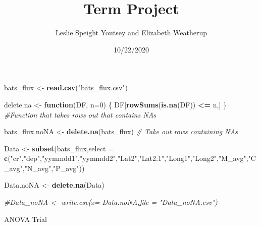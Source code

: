 \documentclass[]{article}
\title{Term Project}
\author{Leslie Speight Youtsey and Elizabeth Weatherup}
\date{10/22/2020}
\newenvironment{Shaded}{\begin{snugshade}}{\end{snugshade}}
\newcommand{\CommentTok}[1]{\textcolor[rgb]{0.56,0.35,0.01}{\textit{#1}}}
\newcommand{\ControlFlowTok}[1]{\textcolor[rgb]{0.13,0.29,0.53}{\textbf{#1}}}
\newcommand{\DataTypeTok}[1]{\textcolor[rgb]{0.13,0.29,0.53}{#1}}
\newcommand{\DecValTok}[1]{\textcolor[rgb]{0.00,0.00,0.81}{#1}}
\newcommand{\KeywordTok}[1]{\textcolor[rgb]{0.13,0.29,0.53}{\textbf{#1}}}
\newcommand{\NormalTok}[1]{#1}
\newcommand{\OperatorTok}[1]{\textcolor[rgb]{0.81,0.36,0.00}{\textbf{#1}}}
\newcommand{\StringTok}[1]{\textcolor[rgb]{0.31,0.60,0.02}{#1}}
\begin{document}
\maketitle

\begin{Shaded}
\begin{Highlighting}[]
\NormalTok{bats_flux <-}\StringTok{ }\KeywordTok{read.csv}\NormalTok{(}\StringTok{"bats_flux.csv"}\NormalTok{)}

\NormalTok{delete.na <-}\StringTok{ }\ControlFlowTok{function}\NormalTok{(DF, }\DataTypeTok{n=}\DecValTok{0}\NormalTok{) \{}
\NormalTok{  DF[}\KeywordTok{rowSums}\NormalTok{(}\KeywordTok{is.na}\NormalTok{(DF)) }\OperatorTok{<=}\StringTok{ }\NormalTok{n,]}
\NormalTok{\} }\CommentTok{#Function that takes rows out that contains NAs }

\NormalTok{bats_flux.noNA <-}\StringTok{ }\KeywordTok{delete.na}\NormalTok{(bats_flux) }\CommentTok{# Take out rows containing NAs }


\NormalTok{Data <-}\StringTok{ }\KeywordTok{subset}\NormalTok{(bats_flux,}\DataTypeTok{select =} \KeywordTok{c}\NormalTok{(}\StringTok{"cr"}\NormalTok{,}\StringTok{"dep"}\NormalTok{,}\StringTok{"yymmdd1"}\NormalTok{,}\StringTok{"yymmdd2"}\NormalTok{,}\StringTok{"Lat2"}\NormalTok{,}\StringTok{"Lat2.1"}\NormalTok{,}\StringTok{"Long1"}\NormalTok{,}\StringTok{"Long2"}\NormalTok{,}\StringTok{"M_avg"}\NormalTok{,}\StringTok{"C_avg"}\NormalTok{,}\StringTok{"N_avg"}\NormalTok{,}\StringTok{"P_avg"}\NormalTok{))}

\NormalTok{Data.noNA <-}\StringTok{ }\KeywordTok{delete.na}\NormalTok{(Data)}

\CommentTok{#Data_noNA <- write.csv(x= Data.noNA,file = "Data_noNA.csv")}
\end{Highlighting}
\end{Shaded}

ANOVA Trial

\begin{Shaded}
\end{Shaded}
\end{document}
